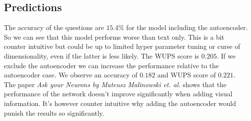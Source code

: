 \documentclass[10pt,a4paper]{report}
\begin{document}
	\subsection*{Predictions}
	The accuracy of the questions are $ 15.4\% $ for the model including the autoencoder. So we can see that this model performs worse than text only. This is a bit counter intuitive but could be up to limited hyper parameter tuning or curse of dimensionality, even if the latter is less likely. The WUPS score is $ 0.205 $. If we exclude the autoencoder we can increase the performance relative to the autoencoder case. We observe an accuracy of $ 0.182 $ and WUPS score of $ 0.221 $. The paper \textit{Ask your Neurons by Mateusz Malinowski et. al.} shows that the performance of the network doesn't improve significantly when adding visual information. It's however counter intuitive why adding the autoencoder would punish the results so significantly.  
	
	
\end{document}
